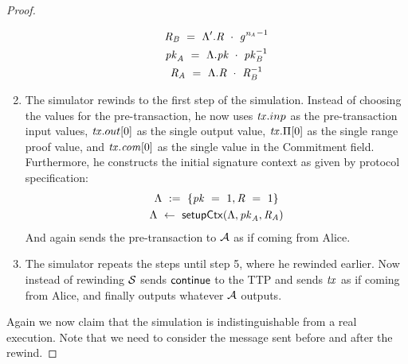 \begin{proof}
\begin{enumerate}
\begin{gather*}
            \mathit{R}_{\mathit{B}} ~=~ {\Lambda}'.\mathit{R} ~\cdot~ {\mathit{g}^{\mathit{\mathit{n}_{\mathit{A}}}}}^{-1} \\
            \mathit{pk}_{\mathit{A}} ~=~ \Lambda.\mathit{pk} ~\cdot~ \mathit{pk}_{\mathit{B}}^{-1} \\
            \mathit{R}_{\mathit{A}} ~=~ \Lambda.\mathit{R} ~\cdot~ \mathit{R}_{\mathit{B}}^{-1}
        \end{gather*}
        \item The simulator rewinds to the first step of the simulation.
        Instead of choosing the values for the pre-transaction, he now uses $\mathit{tx}.inp$ as the pre-transaction input values, $\mathit{tx}.out[0]$ as the single output value, $\mathit{tx}.\Pi[0]$ as the single range proof value, and $\mathit{tx}.\mathit{com}[0]$ as the single value in the Commitment field.
        Furthermore, he constructs the initial signature context as given by protocol specification:
        \begin{gather*}
            \Lambda ~:=~ \{ \mathit{pk} ~=~ 1, \mathit{R} ~=~ 1 \} \\
            \Lambda ~\leftarrow~ \mathsf{setupCtx}( \Lambda, \mathit{pk}_{\mathit{A}}, \mathit{R}_{\mathit{A}} )
        \end{gather*}
        And again sends the pre-transaction to $\mathcal{A}$ as if coming from Alice.
        \item The simulator repeats the steps until step 5, where he rewinded earlier.
        Now instead of rewinding $\mathcal{S}$ sends $\mathsf{continue}$ to the TTP and sends $\mathit{tx}$ as if coming from Alice, and finally outputs whatever $\mathcal{A}$ outputs.
    \end{enumerate}

    Again we now claim that the simulation is indistinguishable from a real execution.
    Note that we need to consider the message sent before and after the rewind.


\end{proof}
